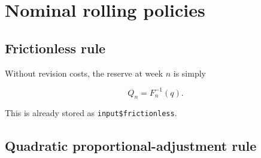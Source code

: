 \documentclass[
  10pt,
]{article}
\newenvironment{Shaded}{\begin{snugshade}}{\end{snugshade}}
\newcommand{\AttributeTok}[1]{\textcolor[rgb]{0.77,0.63,0.00}{#1}}
\newcommand{\ControlFlowTok}[1]{\textcolor[rgb]{0.13,0.29,0.53}{\textbf{#1}}}
\newcommand{\DecValTok}[1]{\textcolor[rgb]{0.00,0.00,0.81}{#1}}
\newcommand{\FloatTok}[1]{\textcolor[rgb]{0.00,0.00,0.81}{#1}}
\newcommand{\FunctionTok}[1]{\textcolor[rgb]{0.00,0.00,0.00}{#1}}
\newcommand{\NormalTok}[1]{#1}
\newcommand{\OtherTok}[1]{\textcolor[rgb]{0.56,0.35,0.01}{#1}}
\newcommand{\SpecialCharTok}[1]{\textcolor[rgb]{0.00,0.00,0.00}{#1}}
\begin{document}
\begin{Shaded}
\end{Shaded}

\hypertarget{nominal-rolling-policies}{%
\section{Nominal rolling policies}\label{nominal-rolling-policies}}

\hypertarget{frictionless-rule}{%
\subsection{Frictionless rule}\label{frictionless-rule}}

Without revision costs, the reserve at week \(n\) is simply

\[
Q_n=F_n^{-1}(q).
\]

This is already stored as \texttt{input\$frictionless}.

\hypertarget{quadratic-proportional-adjustment-rule}{%
\subsection{Quadratic proportional-adjustment
rule}\label{quadratic-proportional-adjustment-rule}}
\end{document}
